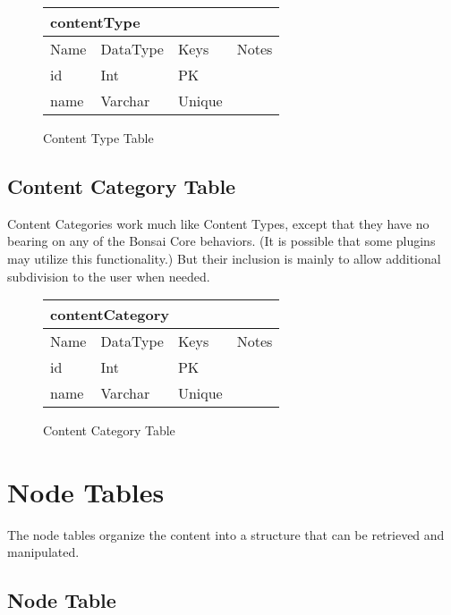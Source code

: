 \documentclass[]{book}
\begin{document}
\begin{figure}[H]
	\centering
	\caption{Content Type Table}
	\vspace{12pt}
	\begin{tabular}{ |p{1.25in}|p{.75in}|p{2in}|p{1in}| }
		\hline
		\multicolumn{4}{|l|}{\textbf{contentType}} \\
		\hline
		\hline
		Name & DataType & Keys & Notes\\
		\hline
		id & Int & PK & \\
		name & Varchar & Unique & \\
		\hline
	\end{tabular}
\end{figure}

\subsection{Content Category Table}

Content Categories work much like Content Types, except that they have no bearing on any of the Bonsai Core behaviors. (It is possible that some plugins may utilize this functionality.) But their inclusion is mainly to allow additional subdivision to the user when needed.

\begin{figure}[H]
	\centering
	\caption{Content Category Table}
	\vspace{12pt}
	\begin{tabular}{ |p{1.25in}|p{.75in}|p{2in}|p{1in}| }
		\hline
		\multicolumn{4}{|l|}{\textbf{contentCategory}} \\
		\hline
		\hline
		Name & DataType & Keys & Notes\\
		\hline
		id & Int & PK & \\
		name & Varchar & Unique & \\
		\hline
	\end{tabular}
\end{figure}

\section{Node Tables}

The node tables organize the content into a structure that can be retrieved and manipulated.

\subsection{Node Table}
\end{document}
